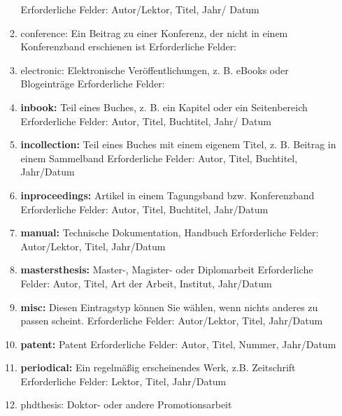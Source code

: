 \begin{enumerate}
\begin{enumerate}
        Erforderliche Felder: Autor/Lektor, Titel, Jahr/ Datum
        \item conference: Ein Beitrag zu einer Konferenz, der nicht in einem Konferenzband erschienen ist\newline
        Erforderliche Felder:
        \item electronic: Elektronische Veröffentlichungen, z. B. eBooks oder Blogeinträge\newline 
        Erforderliche Felder:
        \item \textbf{inbook:} Teil eines Buches, z. B. ein Kapitel oder ein Seitenbereich\newline
        Erforderliche Felder: Autor, Titel, Buchtitel, Jahr/ Datum 
        \item \textbf{incollection:} Teil eines Buches mit einem eigenem Titel, z. B. Beitrag in einem Sammelband\newline
        Erforderliche Felder: Autor, Titel, Buchtitel, Jahr/Datum
        \item \textbf{inproceedings:} Artikel in einem Tagungsband bzw. Konferenzband\newline
        Erforderliche Felder: Autor, Titel, Buchtitel, Jahr/Datum
        \item \textbf{manual:} Technische Dokumentation, Handbuch\newline
        Erforderliche Felder: Autor/Lektor, Titel, Jahr/Datum
        \item \textbf{mastersthesis:} Master-, Magister- oder Diplomarbeit\newline
        Erforderliche Felder: Autor, Titel, Art der Arbeit, Institut, Jahr/Datum
        \item \textbf{misc:} Diesen Eintragstyp können Sie wählen, wenn nichts anderes zu passen scheint. \newline
        Erforderliche Felder: Autor/Lektor, Titel, Jahr/Datum
        \item \textbf{patent:} Patent\newline 
        Erforderliche Felder: Autor, Titel, Nummer, Jahr/Datum
        \item \textbf{periodical:} Ein regelmäßig erscheinendes Werk, z.B. Zeitschrift\newline
        Erforderliche Felder: Lektor, Titel, Jahr/Datum
        \item phdthesis: Doktor- oder andere Promotionsarbeit\newline 

\end{enumerate}
\end{enumerate}
